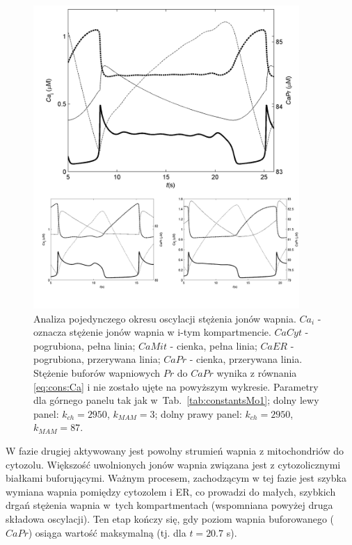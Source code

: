 \begin{figure}[ht]
	\centering
	\includegraphics[width=0.9\textwidth]{rysunki/rozdzial_5/one_periodMo1}
	\caption[Analiza pojedynczego okresu w modelu \#1]{Analiza pojedynczego okresu oscylacji stężenia jonów wapnia. $Ca_i$ - oznacza stężenie jonów wapnia w i-tym kompartmencie. $CaCyt$ - pogrubiona, pełna linia; $CaMit$ - cienka, pełna linia; $CaER$ - pogrubiona, przerywana linia; $CaPr$ - cienka, przerywana linia. Stężenie buforów wapniowych $Pr$ do $CaPr$ wynika z równania \ref{eq:cons:Ca} i nie zostało ujęte na powyższym wykresie. Parametry dla górnego panelu tak jak w~Tab.~\ref{tab:constantsMo1}; dolny lewy panel: $k_{ch} = 2950$, $k_{MAM} = 3$; dolny prawy panel:  $k_{ch} = 2950$, $k_{MAM} = 87$.}
	\label{fig:jedenOkres}
\end{figure}

W fazie drugiej aktywowany jest powolny strumień wapnia z mitochondriów do cytozolu. Większość uwolnionych jonów wapnia związana jest z cytozolicznymi białkami buforującymi. Ważnym procesem, zachodzącym w tej fazie jest szybka wymiana wapnia pomiędzy cytozolem i ER, co prowadzi do małych, szybkich drgań stężenia wapnia w~tych kompartmentach (wspomniana powyżej druga składowa oscylacji). Ten etap kończy się, gdy poziom wapnia buforowanego ($CaPr$) osiąga wartość maksymalną (tj. dla $t = 20.7$ s).


